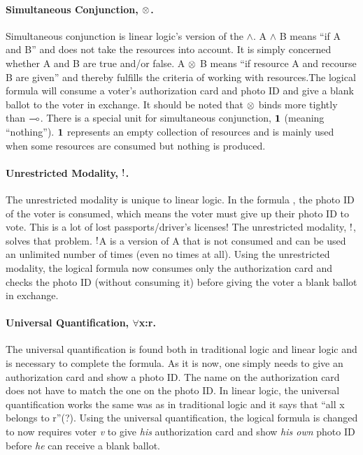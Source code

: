 \paragraph{Simultaneous Conjunction, $\otimes$.} Simultaneous conjunction is linear logic’s version of the $\wedge$. A $\wedge$ B means “if A and B” and does not take the resources into account. It is simply concerned whether A and B are true and/or false. A $\otimes$ B means “if resource A and recourse B are given” and thereby fulfills the criteria of working with resources.The logical formula
will consume a voter’s authorization card and photo ID and give a blank ballot to the voter in exchange. It should be noted that $\otimes$ binds more tightly than $\multimap$.
There is a special unit for simultaneous conjunction, $\mathord{\text{\rm\bf 1}}$ (meaning “nothing”). $\mathord{\text{\rm\bf 1}}$ represents an empty collection of resources and is mainly used when some resources are consumed but nothing is produced.

\paragraph{Unrestricted Modality, $\mathord{\text{\rm !}}$.} The unrestricted modality is unique to linear logic. In the formula , the photo ID of the voter is consumed, which means the voter must give up their photo ID to vote. This is a lot of lost passports/driver’s licenses!
The unrestricted modality, $\mathord{\text{\rm !}}$, solves that problem. $\mathord{\text{\rm !}}$A is a version of A that is not consumed and can be used an unlimited number of times (even no times at all). Using the unrestricted modality, the logical formula
now consumes only the authorization card and checks the photo ID (without consuming it) before giving the voter a blank ballot in exchange. 

\paragraph{Universal Quantification, $\forall$x:r.} The universal quantification is found both in traditional logic and linear logic and is necessary to complete the formula. As it is now, one simply needs to give an authorization card and show a photo ID. The name on the authorization card does not have to match the one on the photo ID.
In linear logic, the universal quantification works the same was as in traditional logic and it says that “all x belongs to r”(?). Using the universal quantification, the logical formula is changed to
now requires voter \textit{v} to give \textit{his} authorization card and show \textit{his own} photo ID before \textit{he} can receive a blank ballot.

